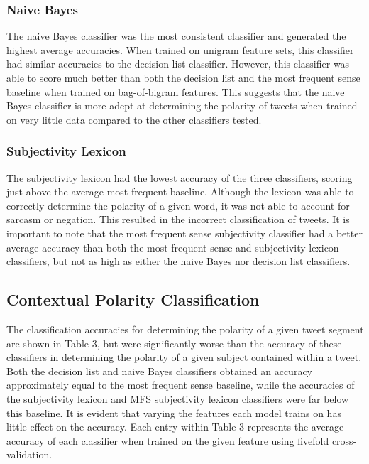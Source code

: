 \documentclass[11pt]{article}
\begin{document}
\subsubsection*{Naive Bayes}
The naive Bayes classifier was the most consistent classifier and generated the highest average accuracies. When trained on unigram feature sets, this classifier had similar accuracies to the decision list classifier. However, this classifier was able to score much better than both the decision list and the most frequent sense baseline when trained on bag-of-bigram features. This suggests that the naive Bayes classifier is more adept at determining the polarity of tweets when trained on very little data compared to the other classifiers tested.

\subsubsection*{Subjectivity Lexicon}
The subjectivity lexicon had the lowest accuracy of the three classifiers, scoring just above the average most frequent baseline. Although the lexicon was able to correctly determine the polarity of a given word, it was not able to account for sarcasm or negation. This resulted in the incorrect classification of tweets. It is important to note that the most frequent sense subjectivity classifier had a better average accuracy than both the most frequent sense and subjectivity lexicon classifiers, but not as high as either the naive Bayes nor decision list classifiers. 

\subsection{Contextual Polarity Classification}
The classification accuracies for determining the polarity of a given tweet segment are shown in Table 3, but were significantly worse than the accuracy of these classifiers in determining the polarity of a given subject contained within a tweet. Both the decision list and naive Bayes classifiers obtained an accuracy approximately equal to the most frequent sense baseline, while the accuracies of the subjectivity lexicon and MFS subjectivity lexicon classifiers were far below this baseline. It is evident that varying the features each model trains on has little effect on the accuracy. Each entry within Table 3 represents the average accuracy of each classifier when trained on the given feature using fivefold cross-validation.
\end{document}
